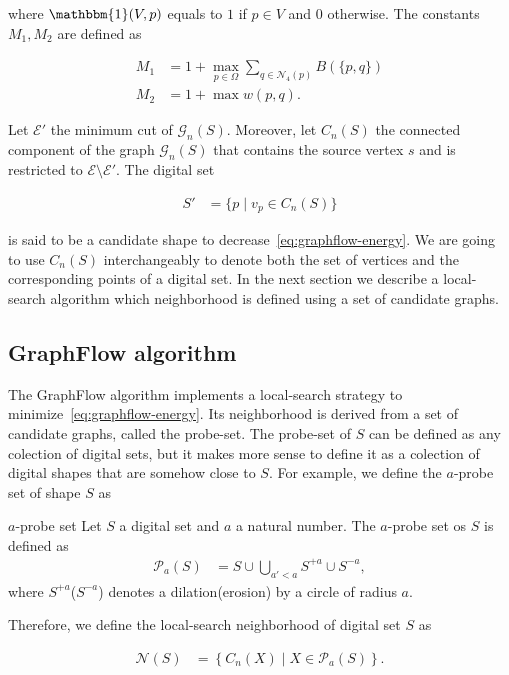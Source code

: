 where $\mathbbm{1}(V,p)$ equals to $1$ if $p \in V$ and $0$ otherwise. The constants $M_1,M_2$ are defined as

\begin{align*}
M_1 &= 1 + \max_{p \in \Omega}{\sum_{q \in \mathcal{N}_4(p)}}{B(\{p,q\})} \\
M_2 &= 1 + \max w(p,q).
\end{align*}


Let $\mathcal{E}'$ the minimum cut of $\mathcal{G}_n(S)$. Moreover, let $C_n(S)$ the connected component of the graph $\mathcal{G}_n(S)$ that contains the source vertex $s$ and is restricted to $\mathcal{E} \setminus \mathcal{E}'$. The digital set 

\begin{align*}
	S' &= \{ p \; | \; v_p \in C_n(S) \}
\end{align*}

is said to be a candidate shape to decrease~\cref{eq:graphflow-energy}. We are going to use $C_n(S)$ interchangeably to denote both the set of vertices and the corresponding points of a digital set. In the next section we describe a local-search algorithm which neighborhood is defined using a set of candidate graphs.
 

\subsection{GraphFlow algorithm}
	The GraphFlow algorithm implements a local-search strategy to minimize~\cref{eq:graphflow-energy}. Its neighborhood is derived from a set of candidate graphs, called the probe-set. 	
	The probe-set of $S$ can be defined as any colection of digital sets, but it makes more sense to define it as a colection of digital shapes that are somehow close to $S$. For example, we define the $a$-probe set of shape $S$ as

\begin{definition}{$a$-probe set}
	Let $S$ a digital set and $a$ a natural number. The $a$-probe set os $S$ is defined as
	\begin{align*}
		\mathcal{P}_a(S) &= S \cup \bigcup_{a' < a}{S^{+a} \cup S^{-a}},
	\end{align*}
	where $S^{+a}$($S^{-a}$) denotes a dilation(erosion) by a circle of radius $a$.
\end{definition}

Therefore, we define the local-search neighborhood of digital set $S$ as

\begin{align*}
	\mathcal{N}(S) &= \left \{ C_n(X) \; | \; X \in \mathcal{P}_a(S) \right\}.
\end{align*}

